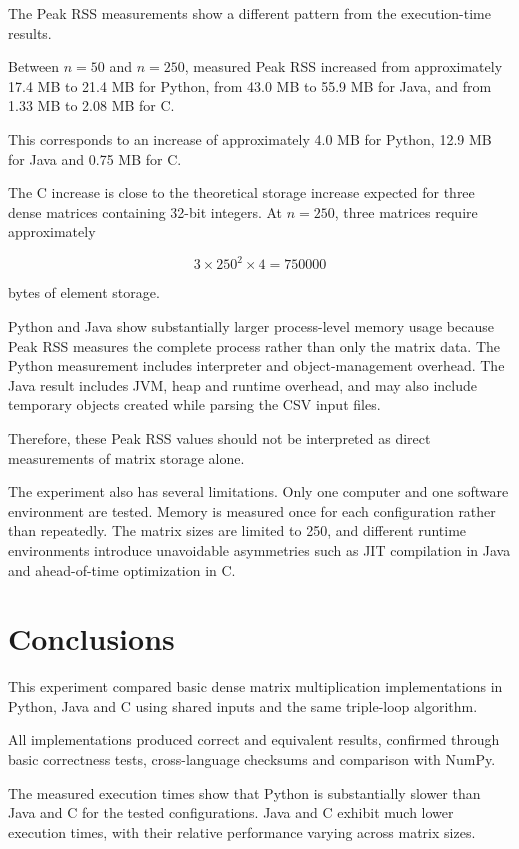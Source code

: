 \documentclass[11pt,a4paper]{article}
\begin{document}
The Peak RSS measurements show a different pattern from the execution-time results.

Between $n=50$ and $n=250$, measured Peak RSS increased from approximately 17.4 MB to 21.4 MB for Python, from 43.0 MB to 55.9 MB for Java, and from 1.33 MB to 2.08 MB for C.

This corresponds to an increase of approximately 4.0 MB for Python, 12.9 MB for Java and 0.75 MB for C.

The C increase is close to the theoretical storage increase expected for three dense matrices containing 32-bit integers. At $n=250$, three matrices require approximately

\[
3 \times 250^2 \times 4 = 750000
\]

bytes of element storage.

Python and Java show substantially larger process-level memory usage because Peak RSS measures the complete process rather than only the matrix data. The Python measurement includes interpreter and object-management overhead. The Java result includes JVM, heap and runtime overhead, and may also include temporary objects created while parsing the CSV input files.

Therefore, these Peak RSS values should not be interpreted as direct measurements of matrix storage alone.

The experiment also has several limitations. Only one computer and one software environment are tested. Memory is measured once for each configuration rather than repeatedly. The matrix sizes are limited to 250, and different runtime environments introduce unavoidable asymmetries such as JIT compilation in Java and ahead-of-time optimization in C.

\section{Conclusions}

This experiment compared basic dense matrix multiplication implementations in Python, Java and C using shared inputs and the same triple-loop algorithm.

All implementations produced correct and equivalent results, confirmed through basic correctness tests, cross-language checksums and comparison with NumPy.

The measured execution times show that Python is substantially slower than Java and C for the tested configurations. Java and C exhibit much lower execution times, with their relative performance varying across matrix sizes.
\end{document}
